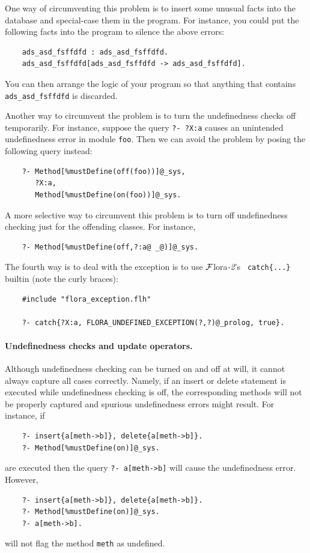 \documentclass[11pt]{article}
\newcommand{\FLORA}{{\mbox{\sc ${\cal F}${lora}\rm\emph{-2}}}\xspace}
\begin{document}
One way of circumventing this problem is to insert some unusual facts into the
database and special-case them in the program. For instance, you could put
the following facts into the program to silence the above errors:
\begin{verbatim}
    ads_asd_fsffdfd : ads_asd_fsffdfd.
    ads_asd_fsffdfd[ads_asd_fsffdfd -> ads_asd_fsffdfd].
\end{verbatim}
You can then arrange the logic of your program so that anything that contains
{\tt ads\_asd\_fsffdfd} is discarded.

Another way to circumvent  the problem is to turn the undefinedness checks
off temporarily. For instance, suppose the query {\tt ?- ?X:a} causes
an unintended undefinedness error in module {\tt foo}. Then we can avoid the
problem by posing the following query instead:
\begin{verbatim}
    ?- Method[%mustDefine(off(foo))]@_sys,
       ?X:a,
       Method[%mustDefine(on(foo))]@_sys.
\end{verbatim}
A more selective way to circumvent this problem is to turn off
undefinedness checking just for the offending classes. For instance,
\begin{verbatim}
    ?- Method[%mustDefine(off,?:a@ _@)]@_sys.
\end{verbatim}

The fourth way is to deal with the exception is to use \FLORA's {\tt
  catch\{...\}} builtin (note the curly braces):
\begin{verbatim}
    #include "flora_exception.flh"

    ?- catch{?X:a, FLORA_UNDEFINED_EXCEPTION(?,?)@_prolog, true}.
\end{verbatim}

\paragraph{Undefinedness checks and update operators.}
Although undefinedness checking can be turned on and off at will, it cannot
always capture all cases correctly. Namely, if an insert or delete
statement is executed while undefinedness checking is off, the
corresponding methods will not be properly captured and spurious
undefinedness errors might result.
For instance, if
\begin{verbatim}
    ?- insert{a[meth->b]}, delete{a[meth->b]}.
    ?- Method[%mustDefine(on)]@_sys.
\end{verbatim}
are executed then the query {\tt ?- a[meth->b]} will cause the
undefinedness error. However,
\begin{verbatim}
    ?- insert{a[meth->b]}, delete{a[meth->b]}.
    ?- Method[%mustDefine(on)]@_sys.
    ?- a[meth->b].
\end{verbatim}
will not flag the method {\tt meth} as undefined.
\end{document}

